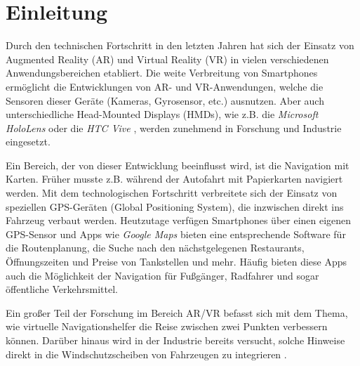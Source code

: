 \chapter{Einleitung}
\label{chap:einleitung}
Durch den technischen Fortschritt in den letzten Jahren hat sich der Einsatz von Augmented Reality (AR) und Virtual Reality (VR) in vielen verschiedenen Anwendungsbereichen etabliert.
Die weite Verbreitung von Smartphones ermöglicht die Entwicklungen von AR- und VR-Anwendungen, welche die Sensoren dieser Geräte (Kameras, Gyrosensor, etc.) ausnutzen.
Aber auch unterschiedliche Head-Mounted Displays (HMDs), wie z.B. die \emph{Microsoft HoloLens} \parencite{Microsoft2018} oder die \emph{HTC Vive} \parencite{???}, werden zunehmend in Forschung und Industrie eingesetzt.

Ein Bereich, der von dieser Entwicklung beeinflusst wird, ist die Navigation mit Karten.
Früher musste z.B. während der Autofahrt mit Papierkarten navigiert werden.
Mit dem technologischen Fortschritt verbreitete sich der Einsatz von speziellen GPS-Geräten (Global Positioning System), die inzwischen direkt ins Fahrzeug verbaut werden.
Heutzutage verfügen Smartphones über einen eigenen GPS-Sensor und Apps wie \emph{Google Maps} \parencite{GoogleLLC2018} bieten eine entsprechende Software für die Routenplanung, die Suche nach den nächstgelegenen Restaurants, Öffnungszeiten und Preise von Tankstellen und mehr.
Häufig bieten diese Apps auch die Möglichkeit der Navigation für Fußgänger, Radfahrer und sogar öffentliche Verkehrsmittel.

Ein großer Teil der Forschung im Bereich AR/VR befasst sich mit dem Thema, wie virtuelle Navigationshelfer die Reise zwischen zwei Punkten verbessern können.
Darüber hinaus wird in der Industrie bereits versucht, solche Hinweise direkt in die Windschutzscheiben von Fahrzeugen zu integrieren \parencites{Cunningham2017}{Sygic2018}.


